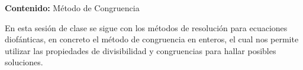 {\Large\textbf{Contenido:} Método de Congruencia}

En esta sesión de clase se sigue con los métodos de resolución para ecuaciones diofánticas, en concreto el método de
congruencia en enteros, el cual nos permite utilizar las propiedades de divisibilidad y congruencias para hallar posibles soluciones.